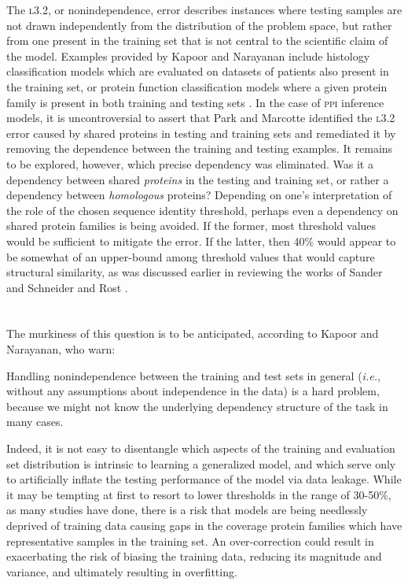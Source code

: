 The \textsc{l3.2}, or nonindependence, error describes instances where testing samples are not drawn independently from the distribution of the problem space, but rather from one present in the training set that is not central to the scientific claim of the model. Examples provided by Kapoor and Narayanan include histology classification models which are evaluated on datasets of patients also present in the training set, or protein function classification models where a given protein family is present in both training and testing sets \cite{Oner_Cheng_Lee_Sung_2020, Whalen_Schreiber_Noble_Pollard_2022}. In the case of \textsc{ppi} inference models, it is uncontroversial to assert that Park and Marcotte identified the \textsc{l3.2} error caused by shared proteins in testing and training sets and remediated it by removing the dependence between the training and testing examples. It remains to be explored, however, which precise dependency was eliminated. Was it a dependency between shared \textit{proteins} in the testing and training set, or rather a dependency between \textit{homologous} proteins? Depending on one's interpretation of the role of the chosen sequence identity threshold, perhaps even a dependency on shared protein families is being avoided. If the former, most threshold values would be sufficient to mitigate the error. If the latter, then 40\% would appear to be somewhat of an upper-bound among threshold values that would capture structural similarity, as was discussed earlier in reviewing the works of Sander and Schneider and Rost \cite{Sander_Schneider_1991, rost_twilight_zone}.
\\\\\\
The murkiness of this question is to be anticipated, according to Kapoor and Narayanan, who warn:

\begin{displayquote}
\begin{singlespace}
Handling nonindependence between the training and test sets in general (\textit{i.e.}, without any assumptions about independence in the data) is a hard problem, because we might not know the underlying dependency structure of the task in many cases.\cite{Kapoor_Narayanan_2023}
\end{singlespace}
\end{displayquote}

Indeed, it is not easy to disentangle which aspects of the training and evaluation set distribution is intrinsic to learning a generalized model, and which serve only to artificially inflate the testing performance of the model via data leakage. While it may be tempting at first to resort to lower thresholds in the range of 30-50\%, as many studies have done, there is a risk that models are being needlessly deprived of training data causing gaps in the coverage protein families which have representative samples in the training set. An over-correction could result in exacerbating the risk of biasing the training data, reducing its magnitude and variance, and ultimately resulting in overfitting.

